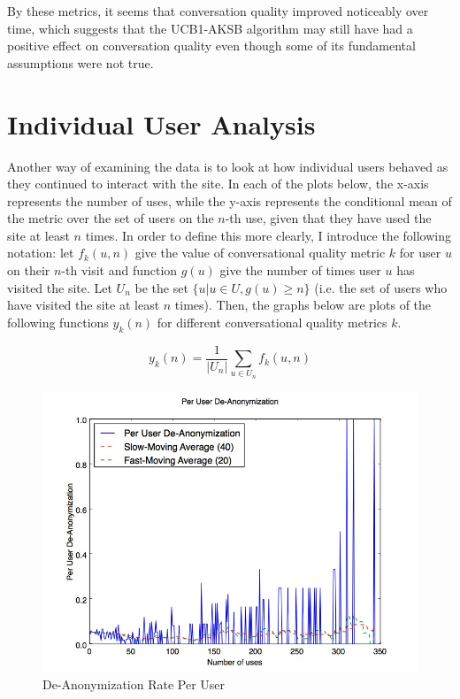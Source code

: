 By these metrics, it seems that conversation quality improved noticeably over time, which suggests that the UCB1-AKSB algorithm may still have had a positive effect on conversation quality even though some of its fundamental assumptions were not true.

\section{Individual User Analysis}
\label{sec:IndividualUserAnalysis}

Another way of examining the data is to look at how individual users behaved as they continued to interact with the site. In each of the plots below, the x-axis represents the number of uses, while the y-axis represents the conditional mean of the metric over the set of users on the $n$-th use, given that they have used the site at least $n$ times. In order to define this more clearly, I introduce the following notation: let $f_k(u, n)$ give the value of conversational quality metric $k$ for user $u$ on their $n$-th visit and function $g(u)$ give the number of times user $u$ has visited the site. Let $U_n$ be the set $\{u | u \in {U}, g(u) \geq{n}\}$ (i.e. the set of users who have visited the site at least $n$ times). Then, the graphs below are plots of the following functions $y_k(n)$ for different conversational quality metrics $k$.

\begin{equation}
y_k(n) = \frac{1}{|U_n|}\sum_{u \in U_n}{f_k(u, n)}
\end{equation}

\begin{figure}[H]
\centering
\includegraphics[trim= 0mm 0mm 0mm 0mm, clip, scale=0.5]{./Figures/PerUserDe-Anonymization.jpg}
\caption{De-Anonymization Rate Per User}
\label{fig:PerUserFBConnect}
\end{figure}

